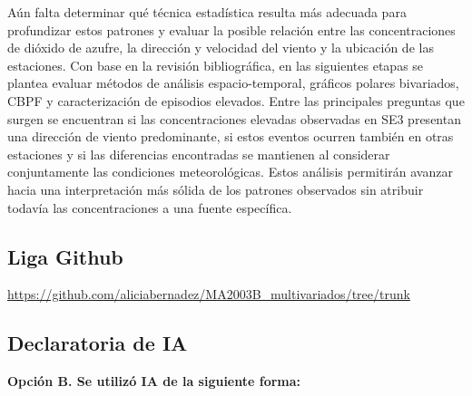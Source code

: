 \documentclass[
  letterpaper,
  DIV=11,
  numbers=noendperiod]{scrartcl}
\begin{document}
Aún falta determinar qué técnica estadística resulta más adecuada para
profundizar estos patrones y evaluar la posible relación entre las
concentraciones de dióxido de azufre, la dirección y velocidad del
viento y la ubicación de las estaciones. Con base en la revisión
bibliográfica, en las siguientes etapas se plantea evaluar métodos de
análisis espacio-temporal, gráficos polares bivariados, CBPF y
caracterización de episodios elevados. Entre las principales preguntas
que surgen se encuentran si las concentraciones elevadas observadas en
SE3 presentan una dirección de viento predominante, si estos eventos
ocurren también en otras estaciones y si las diferencias encontradas se
mantienen al considerar conjuntamente las condiciones meteorológicas.
Estos análisis permitirán avanzar hacia una interpretación más sólida de
los patrones observados sin atribuir todavía las concentraciones a una
fuente específica.

\subsection{Liga Github}\label{liga-github}

\url{https://github.com/aliciabernadez/MA2003B_multivariados/tree/trunk}

\subsection{Declaratoria de IA}\label{declaratoria-de-ia}

\textbf{Opción B. Se utilizó IA de la siguiente forma:}
\end{document}

